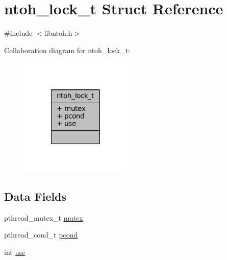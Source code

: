 \hypertarget{structntoh__lock__t}{\section{ntoh\-\_\-lock\-\_\-t Struct Reference}
\label{structntoh__lock__t}
}


{\ttfamily \#include $<$libntoh.\-h$>$}



Collaboration diagram for ntoh\-\_\-lock\-\_\-t\-:
\nopagebreak
\begin{figure}[H]
\begin{center}
\leavevmode
\includegraphics[width=150pt]{structntoh__lock__t__coll__graph}
\end{center}
\end{figure}
\subsection*{Data Fields}
\begin{DoxyCompactItemize}
\item 
pthread\-\_\-mutex\-\_\-t \hyperlink{structntoh__lock__t_a4acff8232e4aec9cd5c6dc200ac55ef3}{mutex}
\item 
pthread\-\_\-cond\-\_\-t \hyperlink{structntoh__lock__t_ae7a6f0d43d482747235ce5732dfd16eb}{pcond}
\item 
int \hyperlink{structntoh__lock__t_a7fa111673285c27a59c5ef465c1ab63b}{use}
\end{DoxyCompactItemize}


